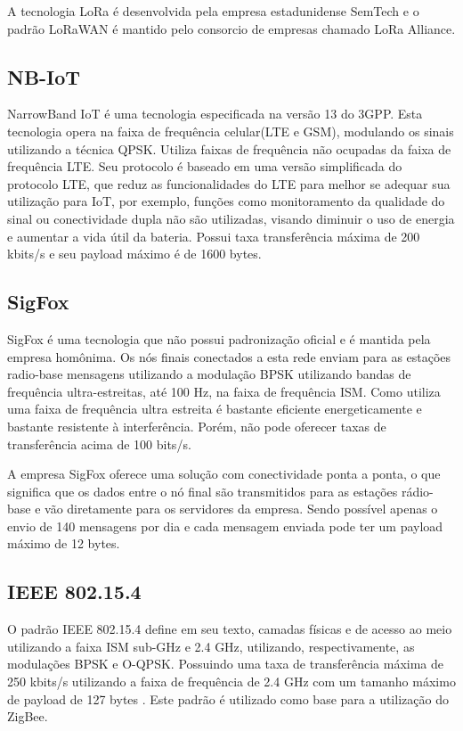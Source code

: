 A tecnologia LoRa é desenvolvida pela empresa estadunidense SemTech e o padrão LoRaWAN é mantido pelo consorcio de empresas chamado LoRa Alliance.

\subsection{NB-IoT}
NarrowBand IoT é uma tecnologia especificada na versão 13 do 3GPP. Esta tecnologia opera na faixa de frequência celular(LTE e GSM), modulando os sinais utilizando a técnica QPSK. Utiliza faixas de frequência não ocupadas da faixa de frequência LTE. Seu protocolo é baseado em uma versão simplificada do protocolo LTE, que reduz as funcionalidades do LTE para melhor se adequar sua utilização para IoT, por exemplo, funções como monitoramento da qualidade do sinal ou conectividade dupla não são utilizadas, visando diminuir o uso de energia e aumentar a vida útil da bateria. Possui taxa transferência máxima de 200 kbits/s e seu payload máximo é de 1600 bytes.

\subsection{SigFox}
SigFox é uma tecnologia que não possui padronização oficial e é mantida pela empresa homônima. Os nós finais conectados a esta rede enviam para as estações radio-base mensagens utilizando a modulação BPSK utilizando bandas de frequência ultra-estreitas, até 100 Hz, na faixa de frequência ISM. Como utiliza uma faixa de frequência ultra estreita é bastante eficiente energeticamente e bastante resistente à interferência. Porém, não pode oferecer taxas de transferência acima de 100 bits/s.

A empresa SigFox oferece uma solução com conectividade ponta a ponta, o que significa que os dados entre o nó final são transmitidos para as estações rádio-base e vão diretamente para os servidores da empresa. Sendo possível apenas o envio de 140 mensagens por dia e cada mensagem enviada pode ter um payload máximo de 12 bytes.

\subsection{IEEE 802.15.4}
O padrão IEEE 802.15.4 define em seu texto, camadas físicas e de acesso ao meio utilizando a faixa ISM sub-GHz e 2.4 GHz, utilizando, respectivamente, as modulações BPSK e O-QPSK. Possuindo uma taxa de transferência máxima de 250 kbits/s utilizando a faixa de frequência de 2.4 GHz com um tamanho máximo de payload de 127 bytes \cite{munoz2018overview} \cite{gomes2017estimaccao}. Este padrão é utilizado como base para a utilização do ZigBee.

